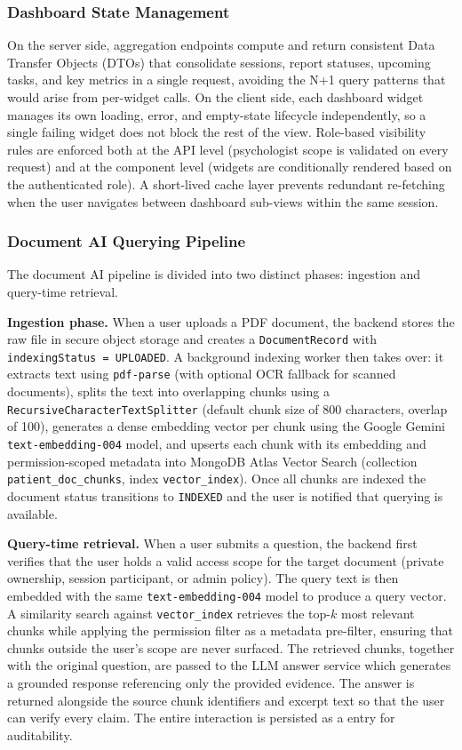 \documentclass[a4paper,12pt]{report}
\begin{document}
\subsubsection*{Dashboard State Management}
 
On the server side, aggregation endpoints compute and return consistent Data Transfer Objects
(DTOs) that consolidate sessions, report statuses, upcoming tasks, and key metrics in a single
request, avoiding the N+1 query patterns that would arise from per-widget calls. On the client
side, each dashboard widget manages its own loading, error, and empty-state lifecycle
independently, so a single failing widget does not block the rest of the view. Role-based
visibility rules are enforced both at the API level (psychologist scope is validated on every
request) and at the component level (widgets are conditionally rendered based on the
authenticated role). A short-lived cache layer prevents redundant re-fetching when the user
navigates between dashboard sub-views within the same session.
 
\subsubsection*{Document AI Querying Pipeline}
 
The document AI pipeline is divided into two distinct phases: ingestion and query-time
retrieval.
 
\textbf{Ingestion phase.} When a user uploads a PDF document, the backend stores the raw file
in secure object storage and creates a \texttt{DocumentRecord} with \texttt{indexingStatus =
UPLOADED}. A background indexing worker then takes over: it extracts text using
\texttt{pdf-parse} (with optional OCR fallback for scanned documents), splits the text into
overlapping chunks using a \texttt{RecursiveCharacterTextSplitter} (default chunk size of 800
characters, overlap of 100), generates a dense embedding vector per chunk using the Google
Gemini \texttt{text-embedding-004} model, and upserts each chunk with its embedding and
permission-scoped metadata into MongoDB Atlas Vector Search (collection
\texttt{patient\_doc\_chunks}, index \texttt{vector\_index}). Once all chunks are indexed the
document status transitions to \texttt{INDEXED} and the user is notified that querying is
available.
 
\textbf{Query-time retrieval.} When a user submits a question, the backend first verifies that
the user holds a valid access scope for the target document (private ownership, session
participant, or admin policy). The query text is then embedded with the same
\texttt{text-embedding-004} model to produce a query vector. A similarity search against
\texttt{vector\_index} retrieves the top-$k$ most relevant chunks while applying the
permission filter as a metadata pre-filter, ensuring that chunks outside the user's scope are
never surfaced. The retrieved chunks, together with the original question, are passed to the
LLM answer service which generates a grounded response referencing only the provided evidence.
The answer is returned alongside the source chunk identifiers and excerpt text so that the
user can verify every claim. The entire interaction is persisted as a 
entry for auditability.
 
\end{document}
